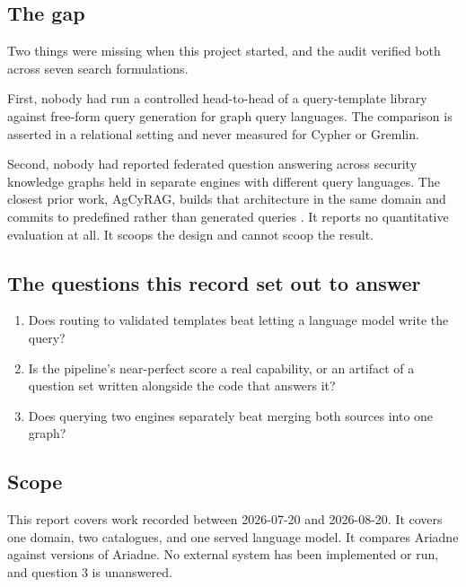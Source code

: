 \subsection{The gap}

Two things were missing when this project started, and the audit verified both
across seven search formulations.

First, nobody had run a controlled head-to-head of a query-template library
against free-form query generation for graph query languages. The comparison is
asserted in a relational setting \citep{finai} and never measured for Cypher or
Gremlin.

Second, nobody had reported federated question answering across security
knowledge graphs held in separate engines with different query languages. The
closest prior work, AgCyRAG, builds that architecture in the same domain and
commits to predefined rather than generated queries \citep{agcyrag}. It reports
no quantitative evaluation at all. It scoops the design and cannot scoop the
result.

\subsection{The questions this record set out to answer}

\begin{enumerate}
  \item Does routing to validated templates beat letting a language model write
        the query?
  \item Is the pipeline's near-perfect score a real capability, or an artifact
        of a question set written alongside the code that answers it?
  \item Does querying two engines separately beat merging both sources into one
        graph?
\end{enumerate}

\subsection{Scope}

This report covers work recorded between 2026-07-20 and 2026-08-20. It covers
one domain, two catalogues, and one served language model. It compares Ariadne
against versions of Ariadne. No external system has been implemented or run, and
question 3 is unanswered.
